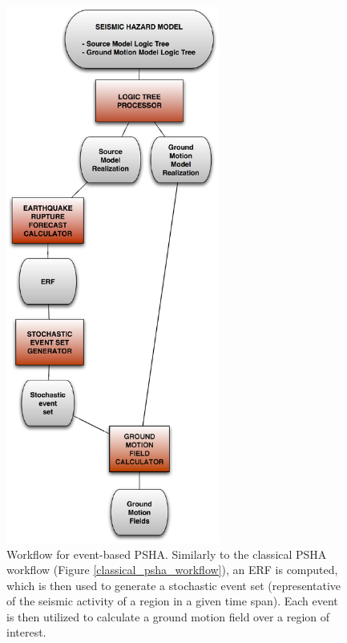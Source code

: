 % 
\begin{figure}[htbp]
\begin{center}
\includegraphics[width=7cm]{./Figures/Part_Hazard/event_based_workflow.eps}
\caption{Workflow for event-based PSHA. Similarly to the classical PSHA workflow 
(Figure \ref{classical_psha_workflow}), an ERF is computed, which is then used 
to generate a stochastic event set (representative of the seismic activity of 
a region in a given time span). Each event is then utilized to calculate a 
ground motion field over a region of interest.}
\label{event_based_workflow}
\end{center}
\end{figure}
%
